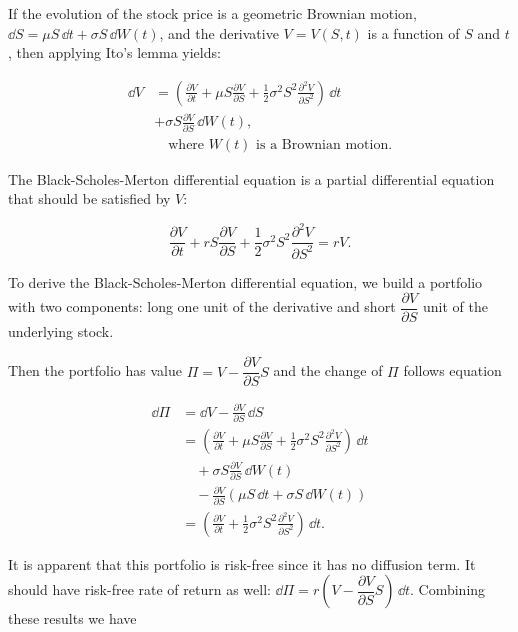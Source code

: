 \begin{solution}
If the evolution of the stock price is a geometric Brownian motion,
$\dd S=\mu S\,\dd t+\sigma S\,\dd W(t)$, and the derivative $V=V(S,t)$ is a function of $S$ and $t$,
then applying Ito's lemma yields:

\[
\begin{aligned}
\dd V&=\left(\frac{\partial V}{\partial t}+\mu S\frac{\partial V}{\partial S}
+\frac{1}{2}\sigma^2S^2\frac{\partial^2V}{\partial S^2}\right)\,\dd t\\
&+\sigma S\frac{\partial V}{\partial S}\,\dd W(t),\\
&\quad\text{where }W(t)\text{ is a Brownian motion.}
\end{aligned}
\]

The Black-Scholes-Merton differential equation is a partial differential equation that
should be satisfied by $V$:

\[
\frac{\partial V}{\partial t}+rS\frac{\partial V}{\partial S}
+\frac{1}{2}\sigma^2S^2\frac{\partial^2V}{\partial S^2}=rV.
\]

To derive the Black-Scholes-Merton differential equation, we build a portfolio with two
components: long one unit of the derivative and short $\dfrac{\partial V}{\partial S}$ unit
of the underlying stock.

Then the portfolio has value $\Pi=V-\dfrac{\partial V}{\partial S}S$ and the change of
$\Pi$ follows equation


\[
\begin{aligned}
\dd\Pi&=\dd V-\frac{\partial V}{\partial S}\,\dd S\\
&=\left(\frac{\partial V}{\partial t}+\mu S\frac{\partial V}{\partial S}
+\frac{1}{2}\sigma^2S^2\frac{\partial^2V}{\partial S^2}\right)\,\dd t\\
&\quad+\sigma S\frac{\partial V}{\partial S}\,\dd W(t)\\
&\quad-\frac{\partial V}{\partial S}\left(\mu S\,\dd t+\sigma S\,\dd W(t)\right)\\
&=\left(\frac{\partial V}{\partial t}+\frac{1}{2}\sigma^2S^2\frac{\partial^2V}{\partial S^2}\right)\,\dd t.
\end{aligned}
\]

It is apparent that this portfolio is risk-free since it has no diffusion term. It should
have risk-free rate of return as well: $\dd\Pi=r\left(V-\dfrac{\partial V}{\partial S}S\right)\,\dd t$.
Combining these results we have


\end{solution}
